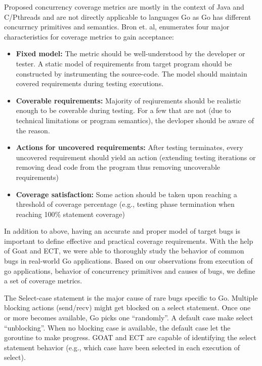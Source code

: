 Proposed concurrency coverage metrics are mostly in the context of Java and C/Pthreads and are not directly applicable to languages Go as Go has different concurrncy primitives and semantics.
%
Bron et. al,\cite{bron-appSyncCov-ppopp05} enumerates four major characteristics for coverage metrics to gain acceptance:
\begin{itemize}
  \item \textbf{Fixed model:} The metric should be well-understood by the developer or tester. A static model of requirements from target program should be constructed by instrumenting the source-code. The model should maintain covered requirements during testing executions.
  \item \textbf{Coverable requirements:} Majority of reqiurements should be realistic enough to be coverable during testing. For a few that are not (due to technical limitations or program semantics), the devloper should be aware of the reason.
  \item \textbf{Actions for uncovered requirements:} After testing terminates, every uncovered requirement should yield an action (\eg extending testing iterations or removing dead code from the program thus removing uncoverable requirements)
  \item \textbf{Coverage satisfaction:} Some action should be taken upon reaching a threshold of coverage percentage (e.g., testing phase termination when reaching 100\% statement coverage)
\end{itemize}

In addition to above, having an accurate and proper model of target bugs is important to define effective and practical coverage requirements.
%
With the help of Goat and ECT, we were able to thoroughly study the behavior of common bugs in real-world Go applications.
%
Based on our observations from execution of go applications, behavior of concurrency primitives and causes of bugs, we define a set of coverage metrics.
%

The Select-case statement is the major cause of rare bugs specific to Go. Multiple blocking actions (send/recv) might get blocked on a select statement. Once one or more becomes available, Go picks one “randomly”. A default case make select “unblocking”. When no blocking case is available, the default case let the goroutine to make progress. GOAT and ECT are capable of identifying the select statement behavior (e.g., which case have been selected in each execution of select).


